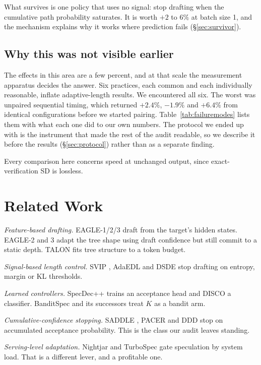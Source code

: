 \documentclass[conference]{IEEEtran}
\begin{document}
What survives is one policy that uses no signal: stop drafting when the cumulative path
probability saturates. It is worth $+2$ to $6\%$ at batch size 1, and the mechanism explains
why it works where prediction fails (\S\ref{sec:survivor}).

\subsection{Why this was not visible earlier}
The effects in this area are a few percent, and at that scale the measurement apparatus
decides the answer. Six practices, each common and each individually reasonable, inflate
adaptive-length results. We encountered all six. The worst was unpaired sequential timing, which
returned $+2.4\%$, $-1.9\%$ and $+6.4\%$ from identical configurations before we started
pairing. Table~\ref{tab:failuremodes} lists them with what each one did to our own numbers.
The protocol we ended up with is the instrument that made the rest of the audit readable, so
we describe it before the results (\S\ref{sec:protocol}) rather than as a separate finding.

Every comparison here concerns speed at unchanged output, since exact-verification SD is
lossless.

\section{Related Work}
\emph{Feature-based drafting.} EAGLE-1/2/3 \cite{li2024eagle,li2024eagle2,li2025eagle3} draft
from the target's hidden states. EAGLE-2 and 3 adapt the tree shape using draft confidence but
still commit to a static depth. TALON \cite{talon} fits tree structure to a token budget.

\emph{Signal-based length control.} SVIP \cite{zhang2024svip}, AdaEDL \cite{adaedl} and DSDE
\cite{dsde} stop drafting on entropy, margin or KL thresholds.

\emph{Learned controllers.} SpecDec++ \cite{specdec} trains an acceptance head and DISCO
\cite{disco} a classifier. BanditSpec \cite{hou2025banditspec} and its successors treat $K$ as
a bandit arm.

\emph{Cumulative-confidence stopping.} SADDLE \cite{saddle}, PACER \cite{pacer} and DDD
\cite{ddd} stop on accumulated acceptance probability. This is the class our audit leaves
standing.

\emph{Serving-level adaptation.} Nightjar \cite{nightjar} and TurboSpec \cite{turbospec} gate
speculation by system load. That is a different lever, and a profitable one.
\end{document}
